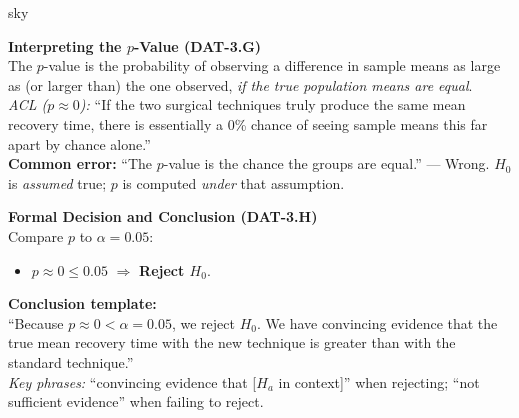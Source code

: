 \documentclass[10pt]{article}
\begin{document}
\begin{skillbox}{sky}
\begin{minipage}[t]{0.48\linewidth}
    \textbf{Interpreting the $p$-Value (DAT-3.G)}\\
    The $p$-value is the probability of observing a difference in sample means as large as
    (or larger than) the one observed, \emph{if the true population means are equal}.\\[6pt]
    \textit{ACL ($p \approx 0$):} ``If the two surgical techniques truly produce the same mean
    recovery time, there is essentially a 0\% chance of seeing sample means this far apart
    by chance alone.''\\[4pt]
    \textbf{Common error:} ``The $p$-value is the chance the groups are equal.''
    --- Wrong. $H_0$ is \emph{assumed} true; $p$ is computed \emph{under} that assumption.
\end{minipage}
\hfill
\begin{minipage}[t]{0.48\linewidth}
    \textbf{Formal Decision and Conclusion (DAT-3.H)}\\
    Compare $p$ to $\alpha = 0.05$:
    \begin{itemize}
        \item $p \approx 0 \le 0.05$ $\Rightarrow$ \textbf{Reject $H_0$}.
    \end{itemize}
    \textbf{Conclusion template:}\\
    ``Because $p \approx 0 < \alpha = 0.05$, we reject $H_0$. We have convincing evidence
    that the true mean recovery time with the new technique is greater than with the standard
    technique.''\\[4pt]
    \textit{Key phrases:} ``convincing evidence that [$H_a$ in context]'' when rejecting;
    ``not sufficient evidence'' when failing to reject.
\end{minipage}
\end{skillbox}
\end{document}
